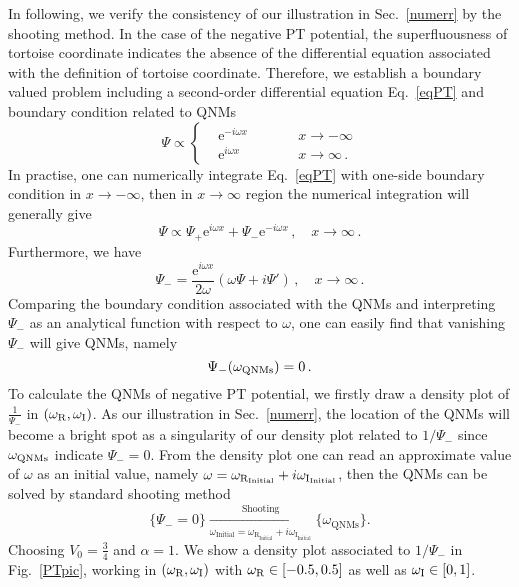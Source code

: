 \documentclass[pr, twocolumn, preprintnumbers, showpacs,footnoteadded, superscriptaddress,nofootinbib,longbibliography]{revtex4-1}
\newcommand{\te}{\mathrm{e}}
\begin{document}
In following, we verify the consistency of our illustration in Sec.~\ref{numerr} by the shooting method. In the case of the negative PT potential, the superfluousness of tortoise coordinate indicates the absence of the differential equation associated with the definition of tortoise coordinate. Therefore, we establish a boundary valued problem including a second-order differential equation Eq.~\eqref{eqPT} and boundary condition related to QNMs
%
\begin{equation}\label{boundpt}
\Psi \varpropto \left\{
\begin{aligned}
&\te^{-i \omega x } \quad \quad  &&x \to -\infty \\
&\te^{i \omega x}   \quad \quad  &&x \to \infty \, .
\end{aligned}
\right.
\end{equation}
%
In practise, one can numerically integrate Eq.~\eqref{eqPT} with one-side boundary condition in $x \to -\infty$, then in $x \to \infty$ region the numerical integration will generally give
%
\begin{equation}
\Psi \varpropto \Psi_{+} \te^{i \omega x} + \Psi_{-} \te^{- i \omega x} \, , \quad x \to \infty \, .
\end{equation}
%
Furthermore, we have
%
\begin{equation}
\Psi_{-}=\frac{\te^{i \omega x}}{2 \omega}\left(\omega \Psi + i \Psi'  \right)\, , \quad x \to \infty \, .
\end{equation}
Comparing the boundary condition associated with the QNMs and interpreting $\Psi_-$ as an analytical function with respect to $\omega$, one can easily find that vanishing $\Psi_{-}$ will give QNMs, namely
%
\begin{equation}
\Psi_{-}(\omega_{\rm QNMs})=0 \, .
\end{equation}
%
To calculate the QNMs of negative PT potential, we firstly draw a density plot of $\frac{1}{\Psi_{-}}$ in $(\omega_{\rm R}, \omega_{\rm I})$. As our illustration in Sec.~\ref{numerr}, the location of the QNMs  will become a bright spot as a singularity of our density plot related to $1/\Psi_{-}$ since $\omega_{\rm QNMs}$ indicate $\Psi_{-}=0$. From the density plot one can read an approximate value of $\omega$ as an initial value, namely $\omega=\omega_{\rm R_{\rm Initial}}+ i \omega_{\rm I_{\rm Initial}}$, then the QNMs can be solved by standard shooting method
%
\begin{equation}
\{\Psi_-=0\}  \xrightarrow[\omega_{\text{Initial}}=\omega_{\text{R}_{\text{Initial}}} + i \omega_{\text{I}_{\text{Initial}}}]{\text{Shooting}} \{\omega_{\text{QNMs}}\}.
\end{equation}
Choosing $V_0=\frac{3}{4}$ and $\alpha = 1$. We show a density plot associated to $1/\Psi_-$ in Fig.~\ref{PTpic}, working in $(\omega_{\text{R}}, \omega_{\rm I})$ with $\omega_{\rm R} \in [-0.5, 0.5]$ as well as $\omega_{\rm I} \in [0, 1]$.
\end{document}
